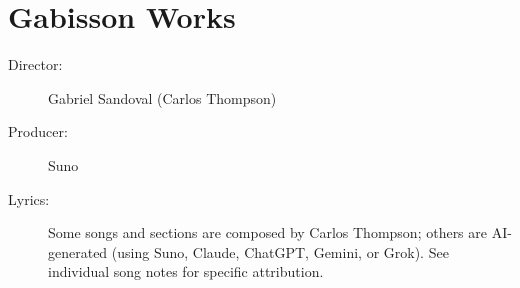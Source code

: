 \chapter{Gabisson Works}

\begin{description}
\item[Director:] Gabriel Sandoval (Carlos Thompson)
\item[Producer:] Suno
\item[Lyrics:] Some songs and sections are composed by Carlos Thompson; others are AI-generated (using Suno, Claude, ChatGPT, Gemini, or Grok). %
See individual song notes for specific attribution.
\end{description}

\sepbar














































